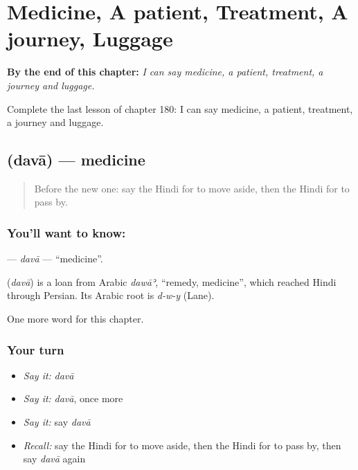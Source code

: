 
\chapter{Medicine, A patient, Treatment, A journey, Luggage}
\label{ch:hi-medicine-a-patient-treatment-a-journey-luggage}

\begin{chapteropening}
\textbf{By the end of this chapter:} \emph{I can say medicine, a patient, treatment, a journey and luggage.}

Complete the last lesson of chapter 180: I can say medicine, a patient, treatment, a journey and luggage.
\end{chapteropening}

\section[\texorpdfstring{\hi{दवा} (davā)}{दवा (davā)}]{ (davā) — medicine}

\label{lesson:HI-C180-dava}



\begin{quote}
Before the new one: say the Hindi for to move aside, then the Hindi for to pass by.
\end{quote}

\subsection*{You'll want to know: }
\textbf{} — \emph{davā} — \textquotedblleft{}medicine\textquotedblright{}.

\begin{cousinweb}
\textbf{} (\emph{davā}) is a loan from Arabic \emph{dawāʾ}, \textquotedblleft{}remedy, medicine\textquotedblright{}, which reached Hindi through Persian. Its Arabic root is \emph{d-w-y} (Lane).
\end{cousinweb}

\begin{grammarlens}[title={What you've built}]
One more word for this chapter.
\end{grammarlens}

\subsection*{Your turn}
\begin{itemize}
\raggedright
  \item \emph{Say it:} \emph{davā}
  \item \emph{Say it:} \emph{davā}, once more
  \item \emph{Say it:} say \emph{davā}
  \item \emph{Recall:} say the Hindi for to move aside, then the Hindi for to pass by, then say \emph{davā} again
\end{itemize}

